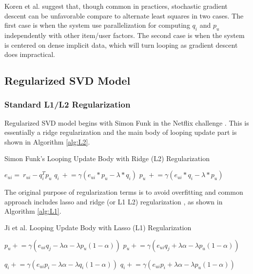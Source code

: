 \documentclass[letter paper, 11pt]{article}
\begin{document}
	Koren et al. \cite{MFinRS} suggest that, though common in practices, stochastic gradient descent can be unfavorable compare to alternate least squares in two cases. The first case is when the system use parallelization for computing $q_i$ and $p_u$ independently with other item/user factors. The second case is when the system is centered on dense implicit data, which will turn looping as gradient descent does impractical.

	

	\subsection{Regularized SVD Model}

	\subsubsection{Standard L1/L2 Regularization}

	\newcommand\myeq{\mathrel{\overset{\makebox[0pt]{\mbox{\normalfont\tiny\sffamily def}}}{=}}}
	\newcommand{\pluseq}{\mathrel{+}=}
	\newcommand{\minuseq}{\mathrel{-}=}
	Regularized SVD model begins with Simon Funk in the Netflix challenge \cite{MFinRS}. This is essentially a ridge regularization and the main body of looping update part is shown in Algorithm \ref{alg:L2}.
	\begin{algorithm}
		\caption{Simon Funk's Looping Update Body with Ridge (L2) Regularization \cite{MFinRS}}
		\label{alg:L2}
		\begin{algorithmic}
			\STATE $e_{ui} = \ r_{ui} - q_i^T p_u$
			\STATE $q_i\ \pluseq \gamma (e_{ui} * p_u - \lambda * q_i)$
			\STATE $p_u\ \pluseq \gamma (e_{ui} * q_i - \lambda * p_u)$
		\end{algorithmic}
	\end{algorithm}

	The original purpose of regularization terms is to avoid overfitting and common approach includes lasso and ridge (or L1 L2) regularization \cite{RSVD-News}, as shown in Algorithm \ref{alg:L1}.
	
	\floatname{algorithm}{Algorithm}
	\begin{algorithm}
		\caption{Ji et al. Looping Update Body with Lasso (L1) Regularization \cite{RSVD-News}}
		\label{alg:L1}
		\begin{algorithmic}
			\IF{$p_u \geq 0$}
				\STATE $p_u \pluseq \gamma (e_{ui} q_j - \lambda \alpha - \lambda p_u ( 1 - \alpha))$
			\ELSE
				\STATE $p_u \pluseq \gamma (e_{ui} q_j + \lambda \alpha - \lambda p_u ( 1 - \alpha))$
			\ENDIF
			
			\IF{$q_i \geq 0$}
				\STATE $q_i \pluseq \gamma (e_{ui} p_i - \lambda \alpha - \lambda q_i ( 1 - \alpha))$
			\ELSE
				\STATE $q_i \pluseq \gamma (e_{ui} p_i + \lambda \alpha - \lambda p_u ( 1 - \alpha))$			
			\ENDIF
		\end{algorithmic}
	\end{algorithm}
\end{document}
